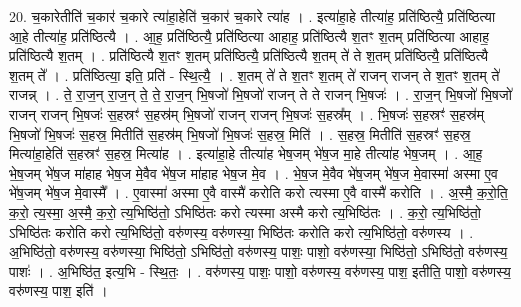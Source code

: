 \documentclass[17pt]{extarticle}
\begin{document}
20. च॒कारेतीति॑ च॒कार॑ च॒कारे त्या॑हा॒हेति॑ च॒कार॑ च॒कारे त्या॑ह । . इत्या॑हा॒हे तीत्या॑ह॒ प्रति॑ष्ठित्यै॒ प्रति॑ष्ठित्या आ॒हे तीत्या॑ह॒ प्रति॑ष्ठित्यै । . आ॒ह॒ प्रति॑ष्ठित्यै॒ प्रति॑ष्ठित्या आहाह॒ प्रति॑ष्ठित्यै श॒तꣳ श॒तम् प्रति॑ष्ठित्या आहाह॒ प्रति॑ष्ठित्यै श॒तम् । . प्रति॑ष्ठित्यै श॒तꣳ श॒तम् प्रति॑ष्ठित्यै॒ प्रति॑ष्ठित्यै श॒तम् ते॑ ते श॒तम् प्रति॑ष्ठित्यै॒ प्रति॑ष्ठित्यै श॒तम् ते᳚ । . प्रति॑ष्ठित्या॒ इति॒ प्रति॑ - स्थि॒त्यै॒ । . श॒तम् ते॑ ते श॒तꣳ श॒तम् ते॑ राजन् राजन् ते श॒तꣳ श॒तम् ते॑ राजन्न् । . ते॒ रा॒ज॒न् रा॒ज॒न् ते॒ ते॒ रा॒ज॒न् भि॒षजो॑ भि॒षजो॑ राजन् ते ते राजन् भि॒षजः॑ । . रा॒ज॒न् भि॒षजो॑ भि॒षजो॑ राजन् राजन् भि॒षजः॑ स॒हस्रꣳ॑ स॒हस्र॑म् भि॒षजो॑ राजन् राजन् भि॒षजः॑ स॒हस्र᳚म् । . भि॒षजः॑ स॒हस्रꣳ॑ स॒हस्र॑म् भि॒षजो॑ भि॒षजः॑ स॒हस्र॒ मितीति॑ स॒हस्र॑म् भि॒षजो॑ भि॒षजः॑ स॒हस्र॒ मिति॑ । . स॒हस्र॒ मितीति॑ स॒हस्रꣳ॑ स॒हस्र॒ मित्या॑हा॒हेति॑ स॒हस्रꣳ॑ स॒हस्र॒ मित्या॑ह । . इत्या॑हा॒हे तीत्या॑ह भेष॒जम् भे॑ष॒ज मा॒हे तीत्या॑ह भेष॒जम् । . आ॒ह॒ भे॒ष॒जम् भे॑ष॒ज मा॑हाह भेष॒ज मे॒वैव भे॑ष॒ज मा॑हाह भेष॒ज मे॒व । . भे॒ष॒ज मे॒वैव भे॑ष॒जम् भे॑ष॒ज मे॒वास्मा॑ अस्मा ए॒व भे॑ष॒जम् भे॑ष॒ज मे॒वास्मै᳚ । . ए॒वास्मा॑ अस्मा ए॒वै वास्मै॑ करोति करो त्यस्मा ए॒वै वास्मै॑ करोति । . अ॒स्मै॒ क॒रो॒ति॒ क॒रो॒ त्य॒स्मा॒ अ॒स्मै॒ क॒रो॒ त्य॒भिष्ठि॑तो॒ ऽभिष्ठि॑तः करो त्यस्मा अस्मै करो त्य॒भिष्ठि॑तः । . क॒रो॒ त्य॒भिष्ठि॑तो॒ ऽभिष्ठि॑तः करोति करो त्य॒भिष्ठि॑तो॒ वरु॑णस्य॒ वरु॑णस्या॒ भिष्ठि॑तः करोति करो त्य॒भिष्ठि॑तो॒ वरु॑णस्य । . अ॒भिष्ठि॑तो॒ वरु॑णस्य॒ वरु॑णस्या॒ भिष्ठि॑तो॒ ऽभिष्ठि॑तो॒ वरु॑णस्य॒ पाशः॒ पाशो॒ वरु॑णस्या॒ भिष्ठि॑तो॒ ऽभिष्ठि॑तो॒ वरु॑णस्य॒ पाशः॑ । . अ॒भिष्ठि॑त॒ इत्य॒भि - स्थि॒तः॒ । . वरु॑णस्य॒ पाशः॒ पाशो॒ वरु॑णस्य॒ वरु॑णस्य॒ पाश॒ इतीति॒ पाशो॒ वरु॑णस्य॒ वरु॑णस्य॒ पाश॒ इति॑ । \newline
\end{document}
